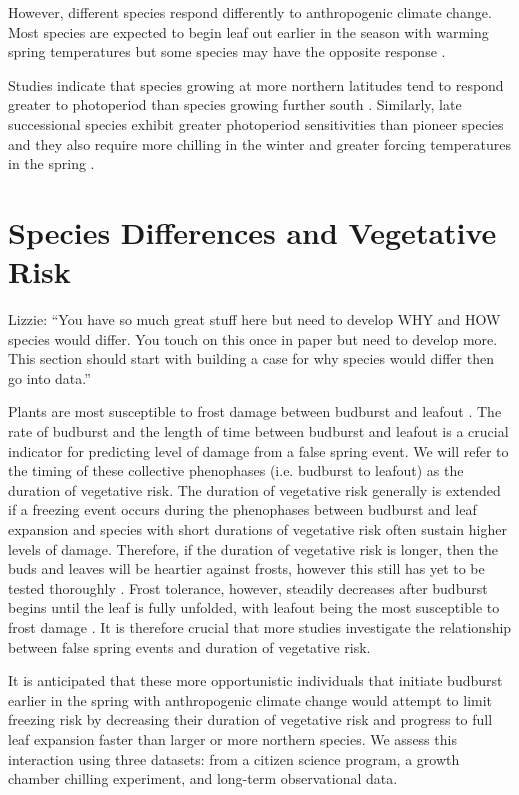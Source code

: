 \documentclass{article}\usepackage[]{graphicx}\usepackage[]{color}
\begin{document}
However, different species respond differently to anthropogenic climate change. Most species are expected to begin leaf out earlier in the season with warming spring temperatures but some species may have the opposite response \citep{Xin2016, Cleland2006, Yu2010}.

Studies indicate that species growing at more northern latitudes tend to respond greater to photoperiod than species growing further south \citep{Caffarra2011, Viheraaarnio2006, Partanen2004}. Similarly, late successional species exhibit greater photoperiod sensitivities than pioneer species \citep{Basler2012} and they also require more chilling in the winter and greater forcing temperatures in the spring \citep{Laube2013}. 

\section*{Species Differences and Vegetative Risk}
Lizzie: ``You have so much great stuff here but need to develop WHY and HOW species would differ. You touch on this once in paper but need to develop more. This section should start with building a case for why species would differ then go into data.''

Plants are most susceptible to frost damage between budburst and leafout \citep{Lenz2016, Vitasse2014, Augspurger2009}. The rate of budburst and the length of time between budburst and leafout is a crucial indicator for predicting level of damage from a false spring event. We will refer to the timing of these collective phenophases (i.e. budburst to leafout) as the duration of vegetative risk. The duration of vegetative risk generally is extended if a freezing event occurs during the phenophases between budburst and leaf expansion and species with short durations of vegetative risk often sustain higher levels of damage. Therefore, if the duration of vegetative risk is longer, then the buds and leaves will be heartier against frosts, however this still has yet to be tested thoroughly \citep{Augspurger2009}. Frost tolerance, however, steadily decreases after budburst begins until the leaf is fully unfolded, with leafout being the most susceptible to frost damage \citep{Lenz2016}. It is therefore crucial that more studies investigate the relationship between false spring events and duration of vegetative risk. 

It is anticipated that these more opportunistic individuals that initiate budburst earlier in the spring with anthropogenic climate change would attempt to limit freezing risk by decreasing their duration of vegetative risk and progress to full leaf expansion faster than larger or more northern species. We assess this interaction using three datasets: from a citizen science program, a growth chamber chilling experiment, and long-term observational data. 
\end{document}
